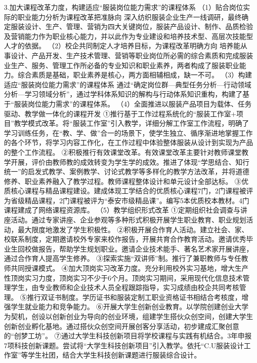 3.加大课程改革力度，构建适应“服装岗位能力需求”的课程体系
（1）贴合岗位实际的职业能力分析为课程改革把准脉向
深入纺织服装企业生产一线调研，最终确定服装设计、生产、管理、营销为四大关键岗位，服装产品设计、制作、品质检验及营销能力作为职业核心能力，并以此作为专业建设和培养技术型、高层次技能型人才的依据。
（2）校企共同制定人才培养目标，为课程改革明确方向
培养能从事设计、产品开发、生产技术管理、营销等职业岗位所必需的综合素质和完成服装业生产、服务、管理工作所必备的专业知识和职业素养，两者构成了服装职业能力。综合素质是基础，职业素养是核心，两方面相辅相成，缺一不可。
（3）构建适应“服装岗位能力需求”的课程体系
通过“确定岗位群—典型任务分析—行动领域分析—学习领域分析”，通过学科体系知识的解构与行动体系知识重构，构建了基于“服装岗位能力需求”的课程体系。
（4）全面推进以服装产品项目为载体、任务驱动、教学做一体化的课程开发
①推行基于工作过程系统化的“服装工作室+项目”教学模式改革。将“服装工作室”引入教学，详细分解工作室工作流程，明确了学习训练任务，在“教、学、做”合一的场景下，使学生独立、循序渐进地掌握工作的各个环节，将学习内容工作化，在工作过程中体验整体服装从设计到实现为产品的整个工作流程。
②积极推行有效课堂改革。有效课堂改革主要针对教师课堂教学开展，评价由教师教的成效转变为学生学的成效。推进了体现“学思结合、知行统一”的启发式教学、案例教学、讨论式教学等多样化的教学方法改革，并将道德修养、职业素养融入了教学过程。教师课程整体设计和单元设计全部达标。
③优质核心课程与精品课程建设。建成体现工学结合的优质核心课程7门，2门课程被评为省级精品课程，2门课程被评为“泰安市级精品课”。编写5本优质校本教材。4门课程建成了网络课程资源库。
（5）教学组织形式改革
①定期组织社会调查与讲座活动。通过专家讲座、企业参观等多种形式积极开展学生职业教育、职业规划活动，最大限度地激发了学生积极性。
②积极开展合作育人活动。建立社会、家、校联系制度，定期邀请校外专家来校作报告，开展共育合作教育活动。邀请优秀毕业生回校做报告，帮助学生规划职业。邀请企业技术能手、著名艺术家开展讲座，通过合作育人提高学生修养。
③探索实施“双讲师”制。推行了兼职教师与专任教师共同授课模式。
④加大顶岗实习改革力度。充分利用校外实习基地，增大生产性顶岗实习力度，顶岗实习不少于6个月。顶岗实习期间，采用现代化信息技术管理学生，由专业教师和企业技术人员全程跟踪指导，实习成绩由校企共同考核管理。
⑤推行双证书制度。学历证书和服装定制工职业资格证书相结合考核度，增强学生就业能力和竞争能力。
⑥开展大学生创新创业教育。以学院创建创业大学为契机，创设以创新创业为导向的创业环境，组建学生搭伙众创空间，创建大学生创新创业孵化基地。通过搭伙众创空间开展创客分享活动，初步建成汇聚创意的“创梦工坊”。
⑦通过大学生科技创新项目将学校课程与实践有机结合。3年申报7项科技创新课题。尝试将“大学生科技创新项目”引入教学。依托“C.U服装设计工作室”等学生社团，结合大学生科技创新课题进行服装综合设计。
